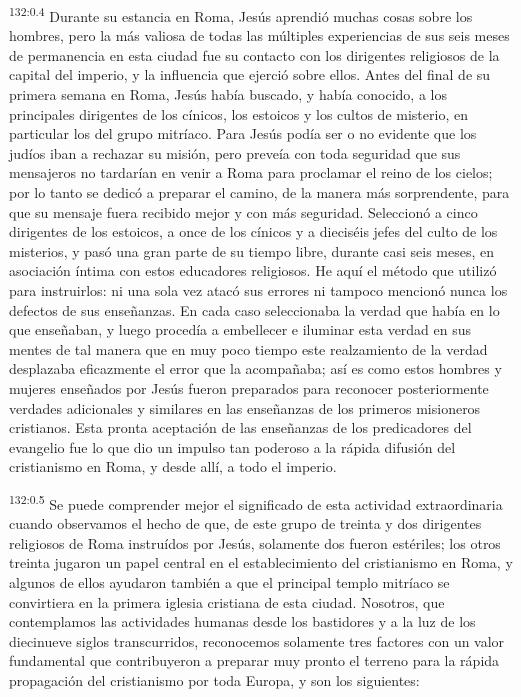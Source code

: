 \par 
\textsuperscript{132:0.4} Durante su estancia en Roma, Jesús aprendió muchas cosas sobre los hombres, pero la más valiosa de todas las múltiples experiencias de sus seis meses de permanencia en esta ciudad fue su contacto con los dirigentes religiosos de la capital del imperio, y la influencia que ejerció sobre ellos. Antes del final de su primera semana en Roma, Jesús había buscado, y había conocido, a los principales dirigentes de los cínicos, los estoicos y los cultos de misterio, en particular los del grupo mitríaco. Para Jesús podía ser o no evidente que los judíos iban a rechazar su misión, pero preveía con toda seguridad que sus mensajeros no tardarían en venir a Roma para proclamar el reino de los cielos; por lo tanto se dedicó a preparar el camino, de la manera más sorprendente, para que su mensaje fuera recibido mejor y con más seguridad. Seleccionó a cinco dirigentes de los estoicos, a once de los cínicos y a dieciséis jefes del culto de los misterios, y pasó una gran parte de su tiempo libre, durante casi seis meses, en asociación íntima con estos educadores religiosos. He aquí el método que utilizó para instruirlos: ni una sola vez atacó sus errores ni tampoco mencionó nunca los defectos de sus enseñanzas. En cada caso seleccionaba la verdad que había en lo que enseñaban, y luego procedía a embellecer e iluminar esta verdad en sus mentes de tal manera que en muy poco tiempo este realzamiento de la verdad desplazaba eficazmente el error que la acompañaba; así es como estos hombres y mujeres enseñados por Jesús fueron preparados para reconocer posteriormente verdades adicionales y similares en las enseñanzas de los primeros misioneros cristianos. Esta pronta aceptación de las enseñanzas de los predicadores del evangelio fue lo que dio un impulso tan poderoso a la rápida difusión del cristianismo en Roma, y desde allí, a todo el imperio.

\par 
\textsuperscript{132:0.5} Se puede comprender mejor el significado de esta actividad extraordinaria cuando observamos el hecho de que, de este grupo de treinta y dos dirigentes religiosos de Roma instruídos por Jesús, solamente dos fueron estériles; los otros treinta jugaron un papel central en el establecimiento del cristianismo en Roma, y algunos de ellos ayudaron también a que el principal templo mitríaco se convirtiera en la primera iglesia cristiana de esta ciudad. Nosotros, que contemplamos las actividades humanas desde los bastidores y a la luz de los diecinueve siglos transcurridos, reconocemos solamente tres factores con un valor fundamental que contribuyeron a preparar muy pronto el terreno para la rápida propagación del cristianismo por toda Europa, y son los siguientes:


